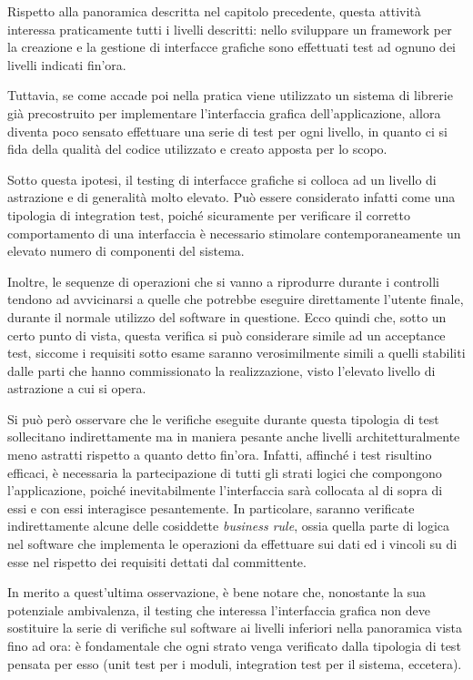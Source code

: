 \documentclass[12pt]{toptesi}
\begin{document}
Rispetto alla panoramica descritta nel capitolo precedente, questa attività interessa praticamente tutti i livelli descritti: nello sviluppare un framework per la creazione e la gestione di interfacce grafiche sono effettuati test ad ognuno dei livelli indicati fin'ora.

Tuttavia, se come accade poi nella pratica viene utilizzato un sistema di librerie già precostruito per implementare l'interfaccia grafica dell'applicazione, allora diventa poco sensato effettuare una serie di test per ogni livello, in quanto ci si fida della qualità del codice utilizzato e creato apposta per lo scopo.

Sotto questa ipotesi, il testing di interfacce grafiche si colloca ad un livello di astrazione e di generalità molto elevato. Può essere considerato infatti come una tipologia di integration test, poiché sicuramente per verificare il corretto comportamento di una interfaccia è necessario stimolare contemporaneamente un elevato numero di componenti del sistema. 

Inoltre, le sequenze di operazioni che si vanno a riprodurre durante i controlli tendono ad avvicinarsi a quelle che potrebbe eseguire direttamente l'utente finale, durante il normale utilizzo del software in questione. Ecco quindi che, sotto un certo punto di vista, questa verifica si può considerare simile ad un acceptance test, siccome i requisiti sotto esame saranno verosimilmente simili a quelli stabiliti dalle parti che hanno commissionato la realizzazione, visto l'elevato livello di astrazione a cui si opera.

Si può però osservare che le verifiche eseguite durante questa tipologia di test sollecitano indirettamente ma in maniera pesante anche livelli architetturalmente meno astratti rispetto a quanto detto fin'ora. Infatti, affinché i test risultino efficaci, è necessaria la partecipazione di tutti gli strati logici che compongono l'applicazione, poiché inevitabilmente l'interfaccia sarà collocata al di sopra di essi e con essi interagisce pesantemente. In particolare, saranno verificate indirettamente alcune delle cosiddette \emph{business rule}, ossia quella parte di logica nel software che implementa le operazioni da effettuare sui dati ed i vincoli su di esse nel rispetto dei requisiti dettati dal committente. %

In merito a quest'ultima osservazione, è bene notare che, nonostante la sua potenziale ambivalenza, il testing che interessa l'interfaccia grafica non deve sostituire la serie di verifiche sul software ai livelli inferiori nella panoramica vista fino ad ora: è fondamentale che ogni strato venga verificato dalla tipologia di test pensata per esso (unit test per i moduli, integration test per il sistema, eccetera). %
\end{document}
